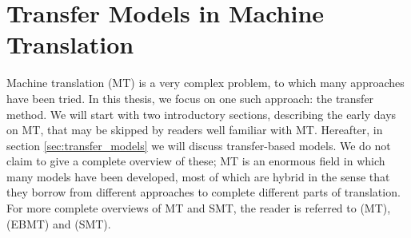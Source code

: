 \documentclass{report}
\theoremstyle{definition}
\theoremstyle{plain}
\begin{document}

\chapter{Transfer Models in Machine Translation}


Machine translation (MT) is a very complex problem, to which many approaches have been tried. In this thesis, we focus on one such approach: the transfer method. We will start with two introductory sections, describing the early days on MT, that may be skipped by readers well familiar with MT. Hereafter, in section \ref{sec:transfer_models} we will discuss transfer-based models. We do not claim to give a complete overview of these; MT is an enormous field in which many models have been developed, most of which are hybrid in the sense that they borrow from different approaches to complete different parts of translation. For more complete overviews of MT and SMT, the reader is referred to \cite{hutchins1992introduction} (MT), \cite{somers1999review} (EBMT) and \cite{koehn2008statistical} (SMT).
\end{document}
